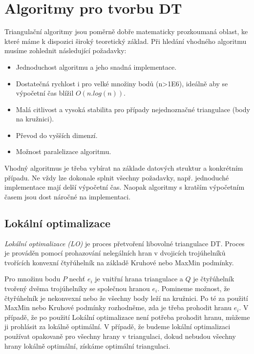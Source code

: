 \documentclass[12pt,a4paper]{article}
\begin{document}
\section{Algoritmy pro tvorbu DT}
Triangulační algoritmy jsou poměrně dobře matematicky prozkoumaná oblast, ke které máme k dispozici široký teoretický základ. Při hledání vhodného algoritmu musíme zohlednit následující požadavky:
\begin{itemize}
\item Jednoduchost algoritmu a jeho snadná implementace.
\item Dostatečná rychlost i pro velké množiny bodů (n>1E6), ideálně aby se výpočetní čas blížil $O(n . log(n))$.
\item Malá citlivost a vysoká stabilita pro případy nejednoznačné triangulace (body na kružnici).
\item Převod do vyšších dimenzí.
\item Možnost paralelizace algoritmu.
\end{itemize}
Vhodný algoritmus je třeba vybírat na základe datových struktur a konkrétním případu. Ne vždy lze dokonale splnit všechny požadavky, např. jednoduché implementace mají delší výpočetní čas. Naopak algoritmy s kratším výpočetním časem jsou dost náročné na implementaci.

\subsection{Lokální optimalizace}
\textit{Lokální optimalizace (LO)} je proces přetvoření libovolné triangulace DT. Proces je prováděn pomocí prohazování nelegálních hran v dvojicích trojúhelníků tvořících konvexní čtyřúhelník na základě Kruhové nebo MaxMin podmínky.

Pro množinu bodu $P$ nechť $e_i$ je vnitřní hrana triangulace a $Q$ je čtyřúhelník tvořený dvěma trojúhelníky se společnou hranou $e_i$. Pomineme možnost, že čtyřúhelník je nekonvexní nebo že všechny body leží na kružnici. Po té za použití MaxMin nebo Kruhové podmínky rozhodněme, zda je třeba prohodit hranu $e_i$. V případě, že po použití Lokální optimalizace není potřeba prohodit hranu, můžeme ji prohlásit za lokálně optimální. V případě, že  budeme lokální optimalizaci používat opakovaně pro všechny hrany v triangulaci, dokud nebudou všechny hrany lokálně optimální, získáme optimální triangulaci.

\end{document}
